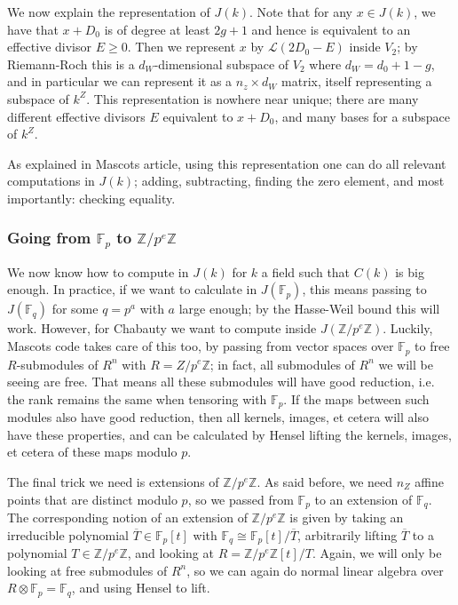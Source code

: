 \documentclass{article}
\newcommand{\Z}{\mathbb{Z}}
\newcommand{\Lcal}{\mathcal{L}}
\newcommand{\F}{\mathbb{F}}
\newcommand{\tensor}{\otimes}
\theoremstyle{plain}
\theoremstyle{definition}
\theoremstyle{remark}
\begin{document}
We now explain the representation of $J(k)$. Note that for any $x \in J(k)$, we have that $x + D_0$ is of degree at least $2g+1$ and hence is equivalent to an effective divisor $E \geq 0$. Then we represent $x$ by $\Lcal(2D_0 - E)$ inside $V_2$; by Riemann-Roch this is a $d_W$-dimensional subspace of $V_2$ where $d_W = d_0 + 1 - g$, and in particular we can represent it as a $n_z \times d_W$ matrix, itself representing a subspace of $k^Z$. This representation is nowhere near unique; there are many different effective divisors $E$ equivalent to $x + D_0$, and many bases for a subspace of $k^Z$.

As explained in Mascots article, using this representation one can do all relevant computations in $J(k)$; adding, subtracting, finding the zero element, and most importantly: checking equality.

\subsubsection{Going from \texorpdfstring{$\F_p$}{Fp} to \texorpdfstring{$\Z/p^e\Z$}{Z/peZ}}
We now know how to compute in $J(k)$ for $k$ a field such that $C(k)$ is big enough. In practice, if we want to calculate in $J(\F_p)$, this means passing to $J(\F_q)$ for some $q = p^a$ with $a$ large enough; by the Hasse-Weil bound this will work. However, for Chabauty we want to compute inside $J(\Z/p^e\Z)$. Luckily, Mascots code takes care of this too, by passing from vector spaces over $\F_p$ to free $R$-submodules of $R^n$ with $R = Z/p^e\Z$; in fact, all submodules of $R^n$ we will be seeing are free. That means all these submodules will have good reduction, i.e. the rank remains the same when tensoring with $\F_p$. If the maps between such modules also have good reduction, then all kernels, images, et cetera will also have these properties, and can be calculated by Hensel lifting the kernels, images, et cetera of these maps modulo $p$.

The final trick we need is extensions of $\Z/p^e\Z$. As said before, we need $n_Z$ affine points that are distinct modulo $p$, so we passed from $\F_p$ to an extension of $\F_q$. The corresponding notion of an extension of $\Z/p^e\Z$ is given by taking an irreducible polynomial $\overline{T} \in \F_p[t]$ with $\F_q \cong \F_p[t]/\overline{T}$, arbitrarily lifting $\overline{T}$ to a polynomial $T \in \Z/p^e\Z$, and looking at $R = \Z/p^e\Z[t]/T$. Again, we will only be looking at free submodules of $R^n$, so we can again do normal linear algebra over $R \tensor \F_p = \F_q$, and using Hensel to lift.
\end{document}
